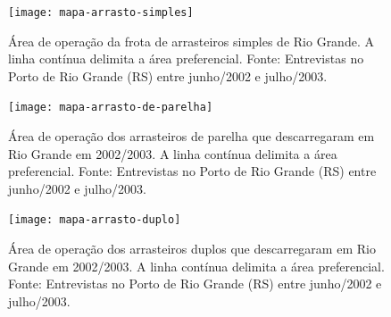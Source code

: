 \documentclass[a4paper,11pt,twoside,showtrims,onecolumn,openright,final]{memoir}
\begin{document}

%
%

\begin{figure}
\begin{center}
\texttt{[image: mapa-arrasto-simples]}
\end{center}
\caption[Área de operação da frota de arrasteiros simples de Rio Grande]
        {Área de operação da frota de arrasteiros simples de Rio Grande. A linha contínua delimita 
	 a área preferencial. Fonte: Entrevistas no Porto de Rio Grande (RS) entre junho/2002 e julho/2003.}
\label{fig:arrasto-simples-areas}
\end{figure}


%
%

\begin{figure}
\begin{center}
\texttt{[image: mapa-arrasto-de-parelha]}
\end{center}
\caption[Área de operação dos arrasteiros de parelha que descarregaram em Rio Grande em 2002/2003]
        {Área de operação dos arrasteiros de parelha que descarregaram em Rio Grande em 2002/2003. 
	 A linha contínua delimita a área preferencial. 
	 Fonte: Entrevistas no Porto de Rio Grande (RS) entre junho/2002 e julho/2003.}
\label{fig:arrasto-parelha-areas}
\end{figure}



%
%

\begin{figure}
\begin{center}
\texttt{[image: mapa-arrasto-duplo]}
\end{center}
\caption[Área de operação dos arrasteiros duplos que descarregaram em Rio Grande em 2002/2003]
        {Área de operação dos arrasteiros duplos que descarregaram em Rio Grande em 2002/2003. 
	 A linha contínua delimita a área preferencial. 
	 Fonte: Entrevistas no Porto de Rio Grande (RS) entre junho/2002 e julho/2003.}
\label{fig:arrasto-duplo-areas}
\end{figure}
\end{document}
